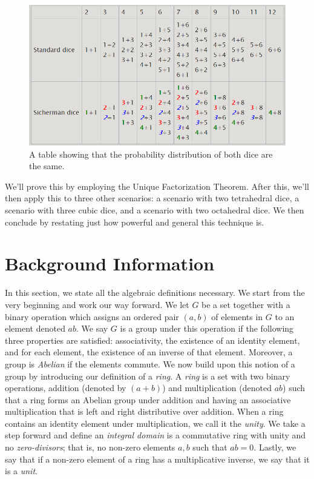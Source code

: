 \documentclass[12pt]{report}
\begin{document}
\begin{figure}[h]
  \includegraphics[width=\linewidth]{images/wikipedia_table.png}
  \caption{A table showing that the probability distribution of both dice are the same.}
  \label{fig:wikipedia_table}
\end{figure}

We'll prove this by employing the Unique Factorization Theorem. After this, we'll then apply this to three
other scenarios: a scenario with two tetrahedral dice, a scenario with three cubic dice, and a scenario with
two octahedral dice. We then conclude by restating just how powerful and general this technique is. 


\section*{Background Information}
In this section, we state all the algebraic definitions necessary. We start from the very beginning and work
our way forward. We let $G$ be a set together with a binary operation which assigns an ordered pair $(a,b)$ of
elements in $G$ to an element denoted $ab$. We say $G$ is a group under this operation if the following three
properties are satisfied: associativity, the existence of an identity element, and for each element, the
existence of an inverse of that element. Moreover, a group is \textit{Abelian} if the elements commute. We now
build upon this notion of a group by introducing our definition of a \textit{ring}. A \textit{ring} is a set
with two binary operations, addition (denoted by $(a+b)$) and multiplication (denoted $ab$) such that a ring
forms an Abelian group under addition and having an associative multiplication that is left and right
distributive over addition. When a ring contains an identity element under multiplication, we call it the
\textit{unity}. We take a step forward and define an \textit{integral domain} is a commutative ring with unity
and no \textit{zero-divisors}; that is, no non-zero elements $a,b$ such that $ab=0$. Lastly, we say that if a
non-zero element of a ring has a multiplicative inverse, we say that it is a \textit{unit}. 
\end{document}
